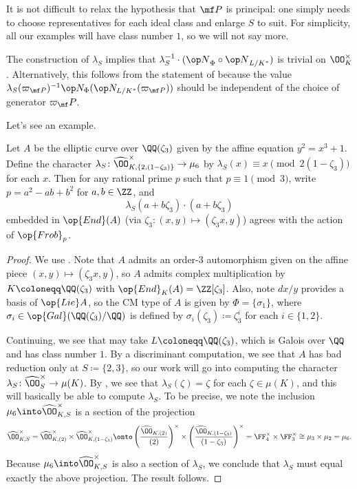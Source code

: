 \documentclass[../thesis.tex]{subfiles}
\begin{document}
\begin{remark}
	It is not difficult to relax the hypothesis that $\mf P$ is principal: one simply needs to choose representatives for each ideal class and enlarge $S$ to suit. For simplicity, all our examples will have class number $1$, so we will not say more.
\end{remark}
\begin{remark} \label{rem:lambda-on-units}
	The construction of $\lambda_S$ implies that $\lambda_S^{-1}\cdot({\op N}_\Phi\circ{\op N}_{L/K^*})$ is trivial on $\OO_K^\times$. Alternatively, this follows from the statement of  because the value $\lambda_S(\varpi_{\mf P})^{-1}\op N_\Phi(\op N_{L/K^*}(\varpi_{\mf P}))$ should be independent of the choice of generator $\varpi_\mf P$.
\end{remark}
Let's see an example.
\begin{example} \label{ex:compute-cm-ec}
	Let $A$ be the elliptic curve over $\QQ(\zeta_3)$ given by the affine equation $y^2=x^3+1$. Define the character $\lambda_S\colon\widehat\OO_{K,\{2,(1-\zeta_3)\}}^\times\to\mu_6$ by $\lambda_S(x)\equiv x\pmod{2(1-\zeta_3)}$ for each $x$. Then for any rational prime $p$ such that $p\equiv1\pmod3$, write $p=a^2-ab+b^2$ for $a,b\in\ZZ$, and
	\[\lambda_S(a+b\zeta_3)\cdot(a+b\zeta_3)\]
	embedded in $\op{End}(A)$ (via $\zeta_3\colon(x,y)\mapsto(\zeta_3x,y)$) agrees with the action of $\op{Frob}_p$.
\end{example}
\begin{proof}
	We use . Note that $A$ admits an order-$3$ automorphism given on the affine piece $(x,y)\mapsto(\zeta_3x,y)$, so $A$ admits complex multiplication by $K\coloneqq\QQ(\zeta_3)$ with $\op{End}_K(A)=\ZZ[\zeta_3]$. Also, note $dx/y$ provides a basis of $\op{Lie}A$, so the CM type of $A$ is given by $\Phi=\{\sigma_1\}$, where $\sigma_i\in\op{Gal}(\QQ(\zeta_3)/\QQ)$ is defined by $\sigma_i(\zeta_3)\coloneqq\zeta_3^i$ for each $i\in\{1,2\}$.
	
	Continuing, we see that may take $L\coloneqq\QQ(\zeta_3)$, which is Galois over $\QQ$ and has class number $1$. By a discriminant computation, we see that $A$ has bad reduction only at $S\coloneqq\{2,3\}$, so our work will go into computing the character $\lambda_S\colon\widehat\OO_S^\times\to\mu(K)$. By , we see that $\lambda_S(\zeta)=\zeta$ for each $\zeta\in\mu(K)$, and this will basically be able to compute $\lambda_S$. To be precise, we note the inclusion $\mu_6\into\widehat\OO_{K,S}^\times$ is a section of the projection
	\[\widehat\OO_{K,S}^\times=\widehat\OO_{K,(2)}^\times\times\widehat\OO_{K,(1-\zeta_3)}^\times\onto\left(\frac{\widehat\OO_{K,(2)}}{(2)}\right)^\times\times\left(\frac{\widehat\OO_{K,(1-\zeta_3)}}{(1-\zeta_3)}\right)^\times=\FF_4^\times\times\FF_3^\times\cong\mu_3\times\mu_2=\mu_6.\]
	Because $\mu_6\into\widehat\OO_{K,S}^\times$ is also a section of $\lambda_S$, we conclude that $\lambda_S$ must equal exactly the above projection. The result follows.
\end{proof}
\end{document}
